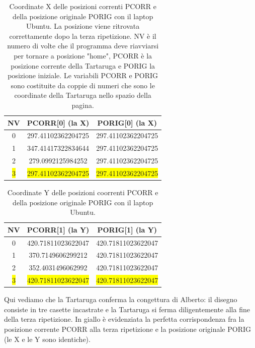\begin{table}[H]
\begin{center}
\begin{tabular}{| c | c | c |}
\hline
	NV & PCORR[0] (la X) & PORIG[0] (la X) \\ \hline
0 & 297.41102362204725 & 297.41102362204725 \\ \hline
1 & 347.41417322834644 & 297.41102362204725 \\ \hline
2 & 279.0992125984252 & 297.41102362204725 \\ \hline
\colorbox{yellow}{3} & \colorbox{yellow}{297.41102362204725} & \colorbox{yellow}{297.41102362204725} \\
\hline
\end{tabular}
\caption{Coordinate X delle posizioni correnti PCORR e della posizione originale PORIG con il laptop Ubuntu. La posizione viene ritrovata correttamente dopo la terza ripetizione. NV è il numero di volte che il programma deve riavviarsi per tornare a posizione "home", PCORR è la posizione corrente della Tartaruga e PORIG la posizione iniziale. Le variabili PCORR e PORIG sono costituite da coppie di numeri che sono le coordinate della Tartaruga nello spazio della pagina.}
\end{center}
\end{table}

\begin{table}[H]
\begin{center}
\begin{tabular}{| c | c | c |}
\hline
	NV & PCORR[1] (la Y) & PORIG[1] (la Y) \\ \hline
0 & 420.71811023622047 & 420.71811023622047 \\ \hline
1 & 370.7149606299212 & 420.71811023622047 \\ \hline
2 & 352.4031496062992 & 420.71811023622047 \\ \hline
\colorbox{yellow}{3} & \colorbox{yellow}{420.71811023622047} & \colorbox{yellow}{420.71811023622047} \\
\hline
\end{tabular}
\caption{Coordinate Y delle posizioni coorrenti PCORR e della posizione originale PORIG con il laptop Ubuntu.}
\end{center}
\end{table}

Qui vediamo che la Tartaruga conferma la congettura di Alberto: il disegno
consiste in tre casette incastrate e la Tartaruga si ferma diligentemente alla
fine della terza ripetizione. In giallo è evidenziata la perfetta
corrispondenza fra la posizione corrente PCORR alla terza ripetizione e la
posizione originale PORIG (le X e le Y sono identiche).


